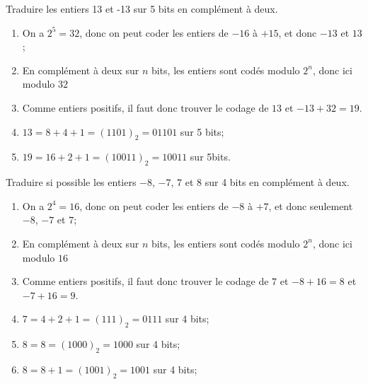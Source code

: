 

\question Traduire les entiers 13 et -13 sur 5 bits en complément à deux.

\begin{solution}
  \begin{enumerate}
  \item On a \(2^5=32\), donc on peut coder les entiers de \(-16\) à
    \(+15\), et donc \(-13\) et \(13\);
  \item En complément à deux sur \(n\) bits, les entiers sont codés
    modulo \(2^n\), donc ici modulo \(32\)
  \item Comme entiers positifs, il faut donc trouver le codage de
    \(13\) et \(-13+32=19\).
  \item \(13=8+4+1=(1101)_2=01101\) sur 5 bits;
  \item \(19=16+2+1=(10011)_2=10011\) sur 5bits.
  \end{enumerate}

\end{solution}


\question Traduire si possible les entiers \(-8\), \(-7\), \(7\) et \(8\) sur 4
bits en complément à deux.

\begin{solution}
  \begin{enumerate}
  \item On a \(2^4=16\), donc on peut coder les entiers de \(-8\) à
    \(+7\), et donc seulement \(-8\), \(-7\) et \(7\);
  \item En complément à deux sur \(n\) bits, les entiers sont codés
    modulo \(2^n\), donc ici modulo \(16\)
  \item Comme entiers positifs, il faut donc trouver le codage de
    \(7\) et \(-8+16=8\) et \(-7+16 = 9\).
  \item \(7=4+2+1=(111)_2=0111\) sur 4 bits;
  \item \(8=8=(1000)_2=1000\) sur 4 bits;
  \item \(8=8+1=(1001)_2=1001\) sur 4 bits;
  \end{enumerate}

\end{solution}